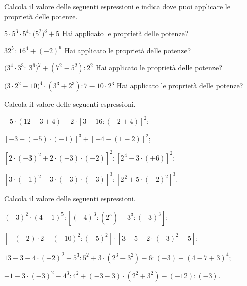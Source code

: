 \begin{esercizio}[\Ast]
Calcola il valore delle seguenti espressioni e indica dove puoi applicare le proprietà delle potenze.
\TabPositions{5.5cm}
\begin{enumeratea}
 \item $5\cdot 5^3\cdot 5^4: \big(5^2\big)^3 +5$ \tab Hai applicato le proprietà delle potenze?\:\dotfill
 \item $32^5:~16^4 +(-2)^9$ \tab Hai applicato le proprietà delle potenze?\:\dotfill
 \item $\big(3^4\cdot 3^3:~3^6\big)^2 +\left(7^2-5^2\right):2^2$ \tab Hai applicato le proprietà delle potenze?\:\dotfill
 \item $\big(3\cdot 2^2 -10\big)^4\cdot \left(3^3+2^3\right):7-10\cdot 2^3$ \tab Hai applicato le proprietà delle potenze?\:\dotfill
\end{enumeratea}
\end{esercizio}

\begin{esercizio}[\Ast]
Calcola il valore delle seguenti espressioni.
 \begin{enumeratea}
 \item $-5\cdot(12-3+4)-2\cdot\left[3-16:(-2+4)\right]^2$;
 \item $\left[-3+(-5)\cdot(-1)\right]^3+\left[-4-(1-2)\right]^2$;
 \item $\left[2\cdot(-3)^2+2\cdot(-3)\cdot(-2)\right]^2:\left[2^4-3\cdot(+6)\right]^2$;
 \item $\left[3\cdot(-1)^2-3\cdot(-3)\cdot(-3)\right]^3:\left[2^2+5\cdot(-2)^2\right]^3$.
 \end{enumeratea}
\end{esercizio}

\begin{esercizio}[\Ast]
Calcola il valore delle seguenti espressioni.
 \begin{enumeratea}
 \item $(-3)^2\cdot(4-1)^5:\left[(-4)^3:\left(2^5\right)-3^3:(-3)^3\right]$;
 \item $\left[-(-2)\cdot2+(-10)^2:(-5)^2\right]\cdot\left[3-5+2\cdot(-3)^2-5\right]$;
 \item $13-3-4\cdot(-2)^2-5^3:5^2+3\cdot\left(2^3-3^2\right)-6:(-3)-(4-7+3)^4$;
 \item $-1-3\cdot(-3)^2-4^3:4^2+(-3-3)\cdot\left(2^2+3^2\right)-(-12):(-3)$.
 \end{enumeratea}
\end{esercizio}

